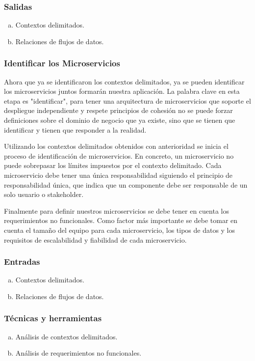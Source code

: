 \subsubsection*{Salidas}
\begin{enumerate}[a.]
    \item Contextos delimitados.
    \item Relaciones de flujos de datos.
\end{enumerate}


\subsubsection{Identificar los Microservicios}

Ahora que ya se identificaron los contextos delimitados, ya se pueden identificar los microservicios
juntos formarán nuestra aplicación.
La palabra clave en esta etapa es "identificar", para tener una arquitectura de microservicios que soporte
el despliegue independiente y respete principios de cohesión no se puede forzar definiciones sobre el
dominio de negocio que ya existe, sino que se tienen que identificar y tienen que responder a la realidad.

Utilizando los contextos delimitados obtenidos con anterioridad se inicia el proceso de identificación
de microservicios.
En concreto, un microservicio no puede sobrepasar los límites impuestos por el contexto delimitado.
Cada microservicio debe tener una única responsabilidad siguiendo el principio de responsabilidad única,
que indica que un componente debe ser responsable de un solo usuario o stakeholder.

Finalmente para definir nuestros microservicios se debe tener en cuenta los requerimientos no funcionales.
Como factor más importante se debe tomar en cuenta el tamaño del equipo para cada microservicio, los tipos
de datos y los requisitos de escalabilidad y fiabilidad de cada microservicio.

\subsubsection*{Entradas}
\begin{enumerate}[a.]
  \item Contextos delimitados.
  \item Relaciones de flujos de datos.
\end{enumerate}

\subsubsection*{Técnicas y herramientas}
\begin{enumerate}[a.]
  \item Análisis de contextos delimitados.
  \item Análisis de requerimientos no funcionales.
\end{enumerate}

